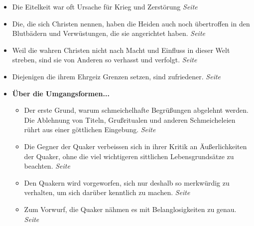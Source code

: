 \begin{itemize}
 \item Die Eitelkeit war oft Ursache für Krieg und Zerstörung
 \dotfill \textit{Seite~\pageref{ref:08_01_stolz}}\\

 \item Die, die sich Christen nennen, haben die Heiden auch noch übertroffen in
den Blutbädern und Verwüstungen, die sie angerichtet haben.
 \dotfill \textit{Seite~\pageref{ref:08_06_heiden}}\\

 \item Weil die wahren Christen nicht nach Macht und Einfluss in dieser Welt
streben, sind sie von Anderen so verhasst und verfolgt.
 \dotfill \textit{Seite~\pageref{ref:08_08_reich_gottes}}\\

 \item Diejenigen die ihrem Ehrgeiz Grenzen setzen, sind zufriedener.
 \dotfill \textit{Seite~\pageref{ref:08_09_friedem}}\\

 \item \textbf{Über die Umgangsformen...}

\begin{itemize}

 \item Der erste Grund, warum schmeichelhafte Begrüßungen abgelehnt werden. Die
Ablehnung von Titeln, Grußritualen und anderen Schmeicheleien rührt aus einer
göttlichen Eingebung.
 \dotfill \textit{Seite~\pageref{ref:09_05_offenbarung}}\\

 \item Die Gegner der Quaker verbeissen sich in ihrer Kritik an Äußerlichkeiten
der Quaker, ohne die viel wichtigeren sittlichen Lebensgrundsätze zu beachten.
 \dotfill \textit{Seite~\pageref{ref:09_06_grundsaetze}}\\

 \item Den Quakern wird vorgeworfen, sich nur deshalb so merkwürdig zu
verhalten, um sich darüber kenntlich zu machen.
 \dotfill \textit{Seite~\pageref{ref:09_07_vorwurff}}\\

 \item Zum Vorwurf, die Quaker nähmen es mit Belanglosigkeiten zu genau.
 \dotfill \textit{Seite~\pageref{ref:09_08_vorwurff}}\\


\end{itemize}
\end{itemize}
